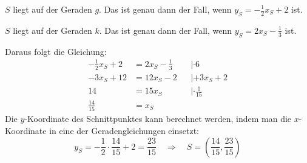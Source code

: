 $S$ liegt auf der Geraden $g$. Das ist genau dann der Fall, wenn $y_{S} = -\frac{1}{2}x_{S} + 2$ ist.

$S$ liegt auf der Geraden $k$. Das ist genau dann der Fall, wenn $y_{S} = 2x_{S} - \frac{1}{3}$ ist.
\medskip

Daraus folgt die Gleichung:
\begin{align*}
    -\frac{1}{2}x_{S} + 2 & = 2x_{S} - \frac{1}{3} &  & |\cdot 6             \\
    -3x_{S} + 12          & = 12x_{S} - 2          &  & |+ 3x_{S} + 2        \\
    14                    & = 15x_{S}              &  & |\cdot \tfrac{1}{15} \\
    \frac{14}{15}         & = x_{S}
\end{align*}
Die $y$-Koordinate des Schnittpunktes kann berechnet werden, indem man die $x$-Koordinate in eine der Geradengleichungen einsetzt:
\[y_{S} = -\frac{1}{2} \cdot \frac{14}{15} + 2 = \frac{23}{15} \quad \Rightarrow \quad S = \left( \frac{14}{15},\frac{23}{15} \right)\]
\newpage

